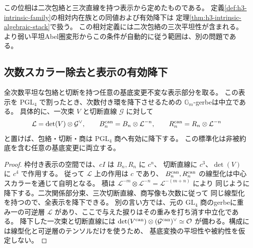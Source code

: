 この位相は二次包絡と三次直線を持つ表示から定めたものである。
定義\ref{def:h3-intrinsic-family}の相対内在族との同値および有効降下は
定理\ref{thm:h3-intrinsic-algebraic-stack}で扱う。
この相対定義には二次包絡の三次平坦性が含まれる。
より弱い平坦Abel圏変形からこの条件が自動的に従う範囲は、別の問題である。

\subsection{次数スカラー除去と表示の有効降下}
\begin{proposition}\label{prop:h3-presentation-canonical-degree-descent}
全次数平坦な包絡と切断を持つ任意の基底変更不変な表示部分を取る。
この表示を $\mathrm{PGL}_4$ で割ったとき、次数付き環を降下させるための
$\mathbb G_m$-gerbeは中立である。
具体的に、一次束 $V$ と切断直線 $\mathcal G$ に対して
\[
 \mathcal L=\det(V)\otimes\mathcal G^\vee,\qquad
 B^{\rm can}_n=B_n\otimes\mathcal L^{-n},\qquad
 R^{\rm can}_n=R_n\otimes\mathcal L^{-n}
\]
と置けば、包絡・切断・商は $\mathrm{PGL}_4$ 商へ有効に降下する。
この標準化は非被約底を含む任意の基底変更に両立する。
\end{proposition}
\begin{proof}
枠付き表示の空間では、$cI$ は $B_n,R_n$ に $c^n$、
切断直線に $c^3$、$\det(V)$ に $c^4$ で作用する。
従って $\mathcal L$ 上の作用は $c$ であり、
$B^{\rm can}_n,R^{\rm can}_n$ の線型化は中心スカラーを通じて自明となる。
積は $\mathcal L^{-m}\otimes\mathcal L^{-n}=\mathcal L^{-(m+n)}$ により
同じように降下する。二次関係部分束、三次切断直線、商写像も次数に従って
同じ線型化を持つので、全表示を降下できる。
別の言い方では、元の $\mathrm{GL}_4$ 商のgerbeに重み一の可逆層
$\mathcal L$ があり、ここで与えた捩りはその重みを打ち消す中立化である。
降下した一次束と切断直線には
$\det(V^{\rm can})\otimes(\mathcal G^{\rm can})^\vee\simeq\mathcal O$
が備わる。構成には線型化と可逆層のテンソルだけを使うため、
基底変換の平坦性や被約性を仮定しない。
\end{proof}

